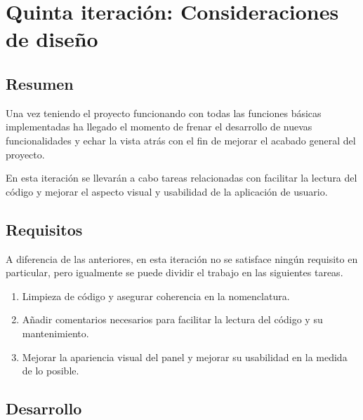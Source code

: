 
\section{Quinta iteración: Consideraciones de diseño}
    \subsection{Resumen}
    
        Una vez teniendo el proyecto funcionando con todas las funciones básicas implementadas ha llegado el momento de frenar el desarrollo de nuevas funcionalidades y echar la vista atrás con el fin de mejorar el acabado general del proyecto.
        
        En esta iteración se llevarán a cabo tareas relacionadas con facilitar la lectura del código y mejorar el aspecto visual y usabilidad de la aplicación de usuario.
    
    \subsection{Requisitos}
    
        A diferencia de las anteriores, en esta iteración no se satisface ningún requisito en particular, pero igualmente se puede dividir el trabajo en las siguientes tareas.
        
        \begin{enumerate}
            \item Limpieza de código y asegurar coherencia en la nomenclatura.
            \item Añadir comentarios necesarios para facilitar la lectura del código y su mantenimiento.
            \item Mejorar la apariencia visual del panel y mejorar su usabilidad en la medida de lo posible.
        \end{enumerate}
    \subsection{Desarrollo}
    
